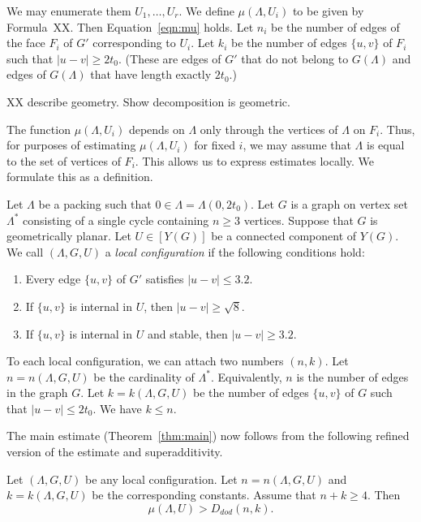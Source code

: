 We may enumerate them $U_1,\ldots,U_r$.  We define
$\mu(\Lambda,U_i)$ to be given by Formula~XX.  Then
Equation~\ref{eqn:mu} holds.  Let $n_i$ be the number of edges of the face
$F_i$ of $G'$ corresponding to $U_i$.  Let $k_i$ be the number of edges
$\{u,v\}$
of $F_i$ such that $|u-v|\ge 2t_0$. (These are edges of $G'$ that do not
belong to $G(\Lambda)$ and edges of $G(\Lambda)$ that have
length exactly $2t_0$.)  

XX describe geometry. Show decomposition is geometric.

The function $\mu(\Lambda,U_i)$ depends on $\Lambda$ only through
the vertices of $\Lambda$ on $F_i$.  Thus, for purposes of estimating
$\mu(\Lambda,U_i)$ for fixed $i$, we may assume that $\Lambda$
is equal to the set of vertices of $F_i$.  This allows us to express
estimates locally.  We formulate this as a definition.

\begin{definition}
Let $\Lambda$ be a packing such that $0\in\Lambda=\Lambda(0,2t_0)$.  
Let $G$ is a graph on vertex set $\Lambda^*$ 
consisting
of a single cycle containing $n\ge 3$ vertices.  
Suppose that $G$ is geometrically planar. 
Let $U\in [Y(G)]$ be a connected component of $Y(G)$.  
We call $(\Lambda,G,U)$ a {\it local configuration} if the
following conditions hold:
\begin{enumerate}
\item Every edge $\{u,v\}$ of $G'$ satisfies $|u-v|\le 3.2$.
\item If
$\{u,v\}$ is internal in  $U$, then $|u-v|\ge \sqrt8$.
\item If $\{u,v\}$ is internal in $U$ and stable,
then $|u-v|\ge 3.2$.
\end{enumerate}
\end{definition}


To each local configuration, we can attach two numbers $(n,k)$.
Let $n=n(\Lambda,G,U)$ be the cardinality of $\Lambda^*$.  Equivalently,
$n$ is the number of edges in the graph $G$.  Let
$k=k(\Lambda,G,U)$ be the number of edges $\{u,v\}$ of $G$ such
that $|u-v|\le 2t_0$. We have $k\le n$.

The main estimate (Theorem~\ref{thm:main}) now follows from the following
refined version of the estimate and superadditivity.

\begin{theorem}\label{thm:main'}  
Let $(\Lambda,G,U)$ be any local configuration.
Let $n=n(\Lambda,G,U)$ and $k=k(\Lambda,G,U)$ be the corresponding constants.
Assume that $n+k\ge 4$.  Then
   $$
   \mu(\Lambda,U) > D_{dod}(n,k).
   $$
\end{theorem}


